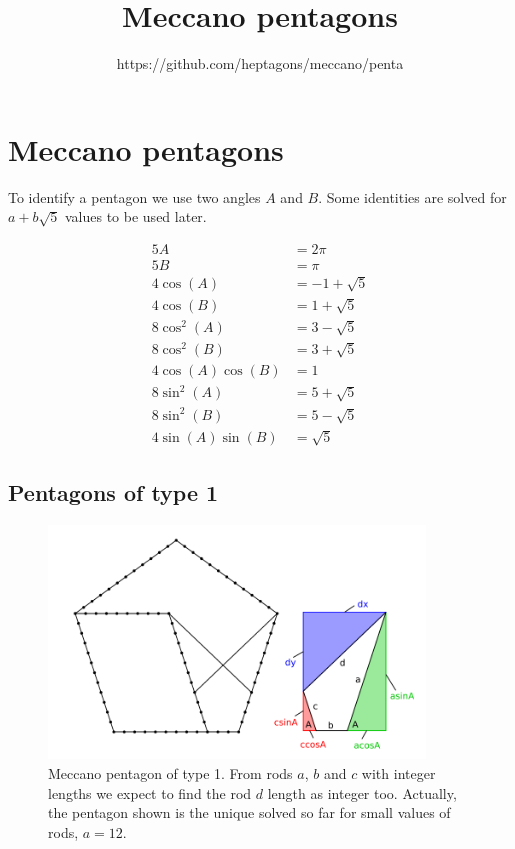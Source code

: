 \documentclass[11pt]{article}
\title{\textbf{Meccano pentagons}}
\author{https://github.com/heptagons/meccano/penta}
\date{}
\begin{document}
\maketitle

\section{Meccano pentagons}

To identify a pentagon we use two angles $A$ and $B$. Some identities are solved for $a + b\sqrt{5}$ values to be used later.

\begin{align*}
5A &= {2\pi} \\
5B &= {\pi} \\
4\cos(A) &=  -1 + \sqrt{5} \\
4\cos(B) &=   1 + \sqrt{5} \\
8\cos^2(A) &= { 3 - \sqrt{5}} \\
8\cos^2(B) &= { 3 + \sqrt{5}} \\
4\cos(A)\cos(B) &= 1 \\
8\sin^2(A) &= 5 + \sqrt{5} \\
8\sin^2(B) &= 5 - \sqrt{5} \\
4\sin(A)\sin(B) &= \sqrt{5}
\end{align*}

\subsection{Pentagons of type 1}

\begin{figure}
\centering
\includegraphics[width=10cm]{figs/pentagon-type-1}
\caption{Meccano pentagon of type 1. From rods $a$, $b$ and $c$ with integer lengths we expect to find the rod $d$ length as integer too. Actually, the pentagon shown is the unique solved so far for small values of rods, $a=12$.}
\label{pentagon-type-1}
\end{figure}
\end{document}
